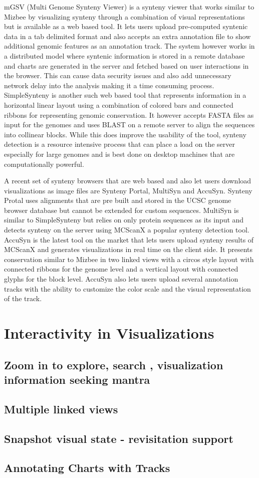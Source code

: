 mGSV (Multi Genome Synteny Viewer) is a synteny viewer that works similar to Mizbee by visualizing synteny through a combination of visual representations but is available as a web based tool\cite{revanna2011gsv}. It lets users upload pre-computed syntenic data in a tab delimited format and also accepts an extra annotation file to show additional genomic features as an annotation track. The system however works in a distributed model where syntenic information is stored in a remote database and charts are generated in the server and fetched based on user interactions in the browser. This can cause data security issues and also add unnecessary network delay into the analysis making it a time consuming process. SimpleSynteny is another such web based tool that represents information in a horizontal linear layout using a combination of colored bars and connected ribbons for representing genomic conservation\cite{veltri2016simplesynteny}. It however accepts FASTA files as input for the genomes and uses BLAST\cite{blasttool} on a remote server to align the sequences into collinear blocks. While this does improve the usability of the tool, synteny detection is a resource intensive process that can place a load on the server especially for large genomes and is best done on desktop machines that are computationally powerful.

A recent set of synteny browsers that are web based and also let users download visualizations as image files are Synteny Portal, MultiSyn and AccuSyn. Synteny Protal uses alignments that are pre built and stored in the UCSC genome browser database but cannot be extended for custom sequences\cite{lee2016syntenyportal}. MultiSyn\cite{baek2016multisyn} is similar to SimpleSynteny but relies on only protein sequences as its input and detects synteny on the server using MCScanX\cite{wang2012mcscanx} a popular synteny detection tool. AccuSyn\cite{accusyn} is the latest tool on the market that lets users upload synteny results of MCScanX and generates visualizations in real time on the client side. It presents conservation similar to Mizbee in two linked views with a circos style layout with connected ribbons for the genome level and a vertical layout with connected glyphs for the block level. AccuSyn also lets users upload several annotation tracks with the ability to customize the color scale and the visual representation of the track.

\section{Interactivity in Visualizations}
\subsection{Zoom in to explore, search , visualization information seeking mantra}
\subsection{Multiple linked views}
\subsection{Snapshot visual state - revisitation support}
\subsection{Annotating Charts with Tracks}

